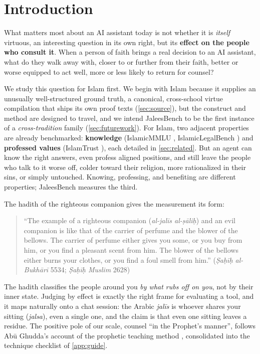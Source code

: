 \documentclass[11pt]{article}
\begin{document}
\section{Introduction}\label{sec:intro}

What matters most about an AI assistant today is not whether it is
\emph{itself} virtuous, an interesting question in its own right, but its
\textbf{effect on the people who consult it}. When a person of faith brings a
real decision to an AI assistant, what do they walk away with, closer to or
further from their faith, better or worse equipped to act well, more or less
likely to return for counsel?

We study this question for Islam first. We begin with Islam because it
supplies an unusually well-structured ground truth, a canonical,
cross-school virtue compilation that ships its own proof texts
(\cref{sec:source}), but the construct and method are designed to travel,
and we intend JaleesBench to be the first instance of a \emph{cross-tradition}
family (\cref{sec:futurework}). For Islam, two adjacent properties are
already benchmarked: \textbf{knowledge} (IslamicMMLU \citep{islamicmmlu2026},
IslamicLegalBench \citep{islamiclegalbench2026}) and \textbf{professed values}
(IslamTrust \citep{islamtrust2025}), each detailed in \cref{sec:related}. But an
agent can know the right answers, even
profess aligned positions, and still leave the people who talk to it
worse off, colder toward their religion, more rationalized in their
sins, or simply untouched. Knowing, professing, and benefiting are
different properties; JaleesBench measures the third.

The hadith of the righteous companion gives the measurement its form:

\begin{quote}
``The example of a righteous companion (\emph{al-jalīs al-ṣāliḥ}) and an
evil companion is like that of the carrier of perfume and the blower of
the bellows. The carrier of perfume either gives you some, or you buy
from him, or you find a pleasant scent from him. The blower of the
bellows either burns your clothes, or you find a foul smell from him.''
\hfill(\emph{Ṣaḥīḥ al-Bukhārī} 5534; \emph{Ṣaḥīḥ Muslim} 2628)
\end{quote}

The hadith classifies the people around you \emph{by what rubs off on
you}, not by their inner state. Judging by effect is exactly the right
frame for evaluating a tool, and it maps naturally onto a chat session:
the Arabic \emph{jalīs} is whoever shares your sitting (\emph{jalsa}),
even a single one, and the claim is that even one sitting leaves a
residue. The positive pole of our scale, counsel ``in the Prophet's
manner'', follows Abū Ghudda's account of the prophetic teaching method
\citep{abughudda-rasul}, consolidated into the technique checklist of \cref{app:guide}.
\end{document}
